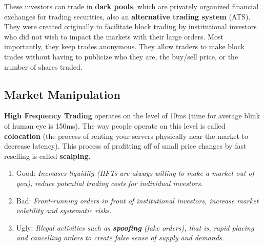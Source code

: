 \documentclass{article}
\begin{document}
    These investors can trade in \textbf{dark pools}, which are privately organized financial exchanges for trading securities, also an \textbf{alternative trading system} (ATS). They were created originally to facilitate block trading by institutional investors who did not wish to impact the markets with their large orders. Most importantly, they keep trades anonymous. They allow traders to make block trades without having to publicize who they are, the buy/sell price, or the number of shares traded. 

  \subsection{Market Manipulation}

    \textbf{High Frequency Trading} operates on the level of 10ms (time for average blink of human eye is 150ms). The way people operate on this level is called \textbf{colocation} (the process of renting your servers physically near the market to decrease latency). This process of profitting off of small price changes by fast reselling is called \textbf{scalping}. 
    \begin{enumerate}
      \item Good: \textit{Increases liquidity (HFTs are always willing to make a market out of you), reduce potential trading costs for individual investors}. 
      \item Bad: \textit{Front-running orders in front of institutional investors, increase market volatility and systematic risks. }
      \item Ugly: \textit{Illegal activities such as \textbf{spoofing} (fake orders), that is, rapid placing and cancelling orders to create false sense of supply and demands. }
    \end{enumerate}
\end{document}
